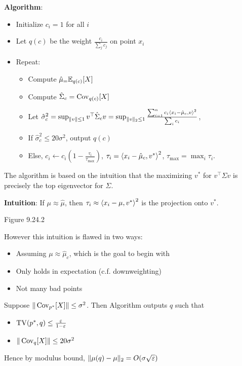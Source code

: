 \textbf{Algorithm}:
\begin{itemize}
  \item Initialize $c_i = 1$ for all $i$
  \item Let $q(c)$ be the weight $\frac{c_i}{\sum_j c_j}$ on point $x_i$
  \item Repeat:
    \begin{itemize}
      \item Compute $\hat\mu_ = \mathbb{E}_{q(c)}[X]$
      \item Compute $\hat\Sigma_c = \operatorname{Cov}_{q(c)}[X]$
      \item Let $\hat\sigma_c^2
        = \sup_{\|v\| \leq 1} v^\top \hat\Sigma_c v
        = \sup_{\|v\|_2 \leq 1} \frac{
          \sum_{i=1}^n c_i \braket{x_i - \hat\mu_c, v}^2
        }{\sum_i c_i}$,
      \item If $\hat\sigma_c^2 \leq 20 \sigma^2$, output $q(c)$
      \item Else, $c_i \leftarrow c_i \left(1 - \frac{\tau_i}{\tau_{\max}}\right)$, $\tau_i = \braket{x_i - \hat\mu_c, v^*}^2$, $\tau_{\max} = \max_i \tau_i$.
    \end{itemize}
\end{itemize}

The algorithm is based on the intuition that
the maximizing $v^*$ for $v^\top \Sigma v$ is precisely
the top eigenvector for $\Sigma$.

\textbf{Intuition}: If $\mu \approx \hat\mu$, then
$\tau_i \approx \braket{x_i - \mu, v^*}^2$ is the projection
onto $v^*$.

Figure 9.24.2

However this intuition is flawed in two ways:
\begin{itemize}
  \item Assuming $\mu \approx \hat\mu_c$, which is the goal to begin with
  \item Only holds in expectation (c.f. downweighting)
  \item Not many bad points
\end{itemize}

\begin{proposition}
  Suppose $\|\operatorname{Cov}_{p^*}[X]\|\leq \sigma^2$.
  Then Algorithm outputs $q$ such that
  \begin{itemize}
    \item $\operatorname{TV}(p^*, q) \leq \frac{\varepsilon}{1-\varepsilon}$
    \item $\|\operatorname{Cov}_q[X]\| \leq 20 \sigma^2$
  \end{itemize}
  Hence by modulus bound, $\|\mu(q) - \mu\|_2 = O(\sigma\sqrt{\varepsilon})$
\end{proposition}


